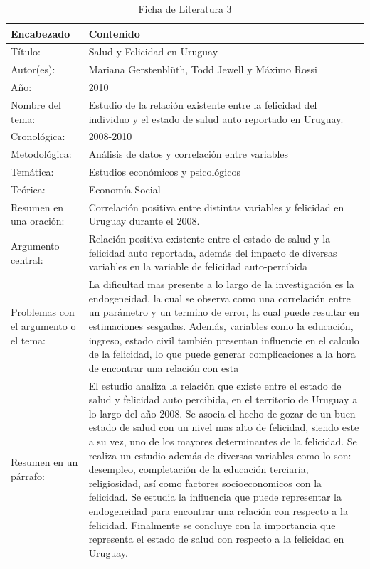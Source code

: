\newpage


\newpage
\begin{table}[H]
    \caption{Ficha de Literatura 3}
    \begin{center}
        \begin{tabular}{  m{3cm} | m{12cm}  }
        \hline\textbf{ Encabezado} & \textbf{Contenido }\\ \hline
        Título: & Salud y Felicidad en Uruguay \\ \hline
        Autor(es): & Mariana Gerstenblüth, Todd Jewell y Máximo Rossi  \\ \hline
        Año: & 2010 \\ \hline
        Nombre del tema: & Estudio de la relación existente entre la felicidad del individuo y el estado de salud auto reportado en Uruguay. \\ \hline
        Cronológica: & 2008-2010 \\ \hline
        Metodológica: & Análisis de datos y correlación entre variables \\ \hline
        Temática: & Estudios económicos y psicológicos \\ \hline
        Teórica: & Economía Social \\ \hline
        Resumen en una oración: & Correlación positiva entre distintas variables y felicidad en Uruguay durante el 2008. \\ \hline
        Argumento central: & Relación positiva existente entre el estado de salud y la felicidad auto reportada, además del impacto de diversas variables en la variable de felicidad auto-percibida \\ \hline
        Problemas con el argumento o el tema: & La dificultad mas presente a lo largo de la investigación es la endogeneidad, la cual se observa como una correlación entre un parámetro y un termino de error, la cual puede resultar en estimaciones sesgadas. Además, variables como la educación, ingreso, estado civil también presentan influencie en el calculo de la felicidad, lo que puede generar complicaciones a la hora de encontrar una relación con esta  \\ \hline
        Resumen en un párrafo: & El estudio analiza la relación que existe entre el estado de salud y felicidad auto percibida, en el territorio de Uruguay a lo largo del año 2008. Se asocia el hecho de gozar de un buen estado de salud con un nivel mas alto de felicidad, siendo este a su vez, uno de los mayores determinantes de la felicidad. Se realiza un estudio además de diversas variables como lo son: desempleo, completación de la educación terciaria, religiosidad, así como factores socioeconomicos con la felicidad. Se estudia la influencia que puede representar la endogeneidad para encontrar una relación con respecto a la felicidad. Finalmente se concluye con la importancia que representa el estado de salud con respecto a la felicidad en Uruguay.
        \\ \hline
        \end{tabular}
    \end{center}
\end{table}
